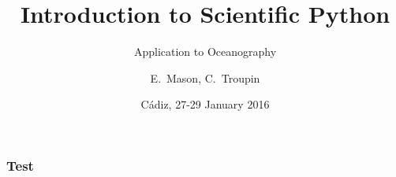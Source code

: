 
\parindent 0cm

\title[Scientific Python]{Introduction to Scientific Python}
\subtitle{Application to Oceanography}
\date[]{Cádiz, 27-29 January 2016}
\author{E.~Mason, C.~Troupin}



\begin{frame}
\centering

\footnotesize
\maketitle


\end{frame}





\begin{frame}
\end{frame}


\begin{frame}
\frametitle{Test}

\end{frame}
  

